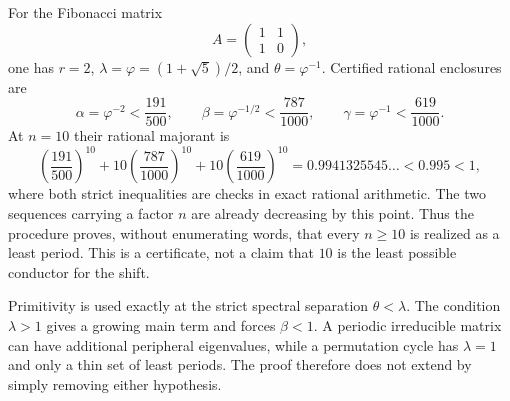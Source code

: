 \begin{example}
\label{ex:fibonacci}
For the Fibonacci matrix
\[
 A=\begin{pmatrix}1&1\\1&0\end{pmatrix},
\]
one has $r=2$, $\lambda=\varphi=(1+\sqrt5)/2$, and
$\theta=\varphi^{-1}$.  Certified rational enclosures are
\[
 \alpha=\varphi^{-2}<\frac{191}{500},\qquad
 \beta=\varphi^{-1/2}<\frac{787}{1000},\qquad
 \gamma=\varphi^{-1}<\frac{619}{1000}.
\]
At $n=10$ their rational majorant is
\[
 \left(\frac{191}{500}\right)^{10}
 +10\left(\frac{787}{1000}\right)^{10}
 +10\left(\frac{619}{1000}\right)^{10}
 =0.9941325545\ldots<0.995<1,
\]
where both strict inequalities are checks in exact rational arithmetic.
The two sequences carrying a factor $n$ are already decreasing by this
point.  Thus the procedure proves, without enumerating words, that every
$n\ge10$ is realized as a least period.  This is a certificate, not a claim
that $10$ is the least possible conductor for the shift.
\end{example}

\begin{remark}
Primitivity is used exactly at the strict spectral separation
$\theta<\lambda$.  The condition $\lambda>1$ gives a growing main term and
forces $\beta<1$.  A periodic irreducible matrix can have additional
peripheral eigenvalues, while a permutation cycle has $\lambda=1$ and only a
thin set of least periods.  The proof therefore does not extend by simply
removing either hypothesis.
\end{remark}
